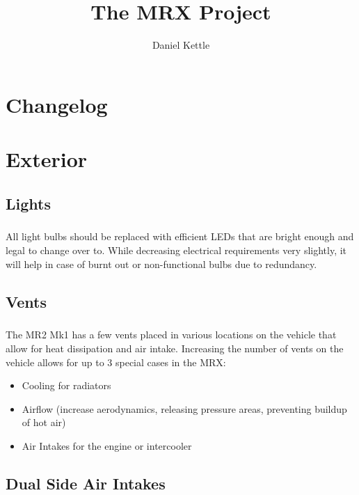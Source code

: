 \documentclass[a4paper,10pt]{report}
\title{The MRX  Project}
\author{Daniel Kettle}
\begin{document}

\maketitle


\begin{abstract}
\end{abstract}

\chapter{Changelog}
\chapter{Exterior}

\section{Lights}
\paragraph*{}All light bulbs should be replaced with efficient LEDs that are bright enough and legal to change over to. While decreasing electrical requirements very slightly, it will help in case of burnt out or non-functional bulbs due to redundancy.

\section{Vents}
\paragraph*{}The MR2 Mk1 has a few vents placed in various locations on the vehicle that allow for heat dissipation and air intake. Increasing the number of vents on the vehicle allows for up to 3 special cases in the MRX:
\begin{itemize}
 \item Cooling for radiators
 \item Airflow (increase aerodynamics, releasing pressure areas, preventing buildup of hot air)
 \item Air Intakes for the engine or intercooler
\end{itemize}


\section{Dual Side Air Intakes}
\end{document}
